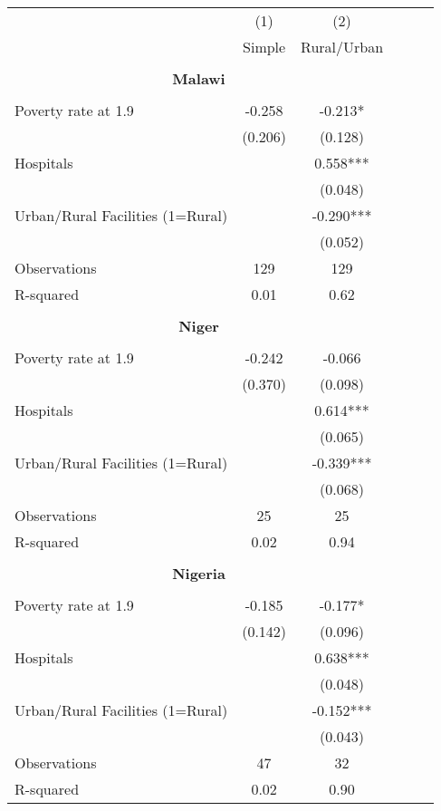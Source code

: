 \begin{tabular}{l*{5}{c}} \hline\hline
                &\multicolumn{1}{c}{(1)}&\multicolumn{1}{c}{(2)}\\
                &\multicolumn{1}{c}{Simple}&\multicolumn{1}{c}{Rural/Urban}\\
\hline \\ \multicolumn{3}{c}{\textbf{Malawi}} \\\\[-1ex]
Poverty rate at 1.9&   -0.258   &   -0.213*  \\
                &  (0.206)   &  (0.128)   \\
Hospitals       &            &    0.558***\\
                &            &  (0.048)   \\
Urban/Rural Facilities (1=Rural)&            &   -0.290***\\
                &            &  (0.052)   \\
\hline
Observations    &      129   &      129   \\
R-squared       &     0.01   &     0.62   \\
\hline \\ \multicolumn{3}{c}{\textbf{Niger}} \\\\[-1ex]
Poverty rate at 1.9&   -0.242   &   -0.066   \\
                &  (0.370)   &  (0.098)   \\
Hospitals       &            &    0.614***\\
                &            &  (0.065)   \\
Urban/Rural Facilities (1=Rural)&            &   -0.339***\\
                &            &  (0.068)   \\
\hline
Observations    &       25   &       25   \\
R-squared       &     0.02   &     0.94   \\
\hline \\ \multicolumn{3}{c}{\textbf{Nigeria}} \\\\[-1ex]
Poverty rate at 1.9&   -0.185   &   -0.177*  \\
                &  (0.142)   &  (0.096)   \\
Hospitals       &            &    0.638***\\
                &            &  (0.048)   \\
Urban/Rural Facilities (1=Rural)&            &   -0.152***\\
                &            &  (0.043)   \\
\hline
Observations    &       47   &       32   \\
R-squared       &     0.02   &     0.90   \\
\hline\hline \end{tabular}
